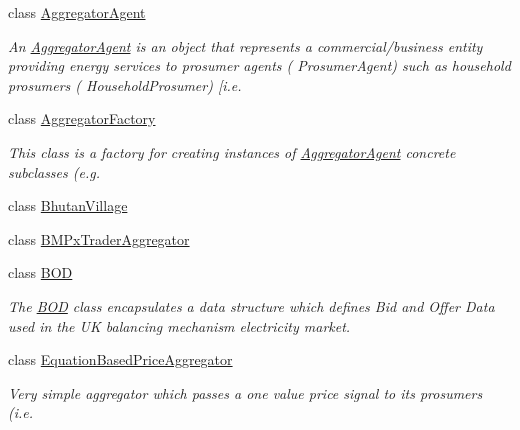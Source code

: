 \begin{DoxyCompactItemize}
\item 
class \hyperlink{classuk_1_1ac_1_1dmu_1_1iesd_1_1cascade_1_1agents_1_1aggregators_1_1_aggregator_agent}{Aggregator\-Agent}
\begin{DoxyCompactList}\small\item\em An {\itshape \hyperlink{classuk_1_1ac_1_1dmu_1_1iesd_1_1cascade_1_1agents_1_1aggregators_1_1_aggregator_agent}{Aggregator\-Agent}} is an object that represents a commercial/business entity providing energy services to prosumer agents ( {\ttfamily Prosumer\-Agent}) such as household prosumers ( {\ttfamily Household\-Prosumer}) \mbox{[}i.\-e. \end{DoxyCompactList}\item 
class \hyperlink{classuk_1_1ac_1_1dmu_1_1iesd_1_1cascade_1_1agents_1_1aggregators_1_1_aggregator_factory}{Aggregator\-Factory}
\begin{DoxyCompactList}\small\item\em This class is a factory for creating instances of {\ttfamily \hyperlink{classuk_1_1ac_1_1dmu_1_1iesd_1_1cascade_1_1agents_1_1aggregators_1_1_aggregator_agent}{Aggregator\-Agent}} concrete subclasses (e.\-g. \end{DoxyCompactList}\item 
class \hyperlink{classuk_1_1ac_1_1dmu_1_1iesd_1_1cascade_1_1agents_1_1aggregators_1_1_bhutan_village}{Bhutan\-Village}
\item 
class \hyperlink{classuk_1_1ac_1_1dmu_1_1iesd_1_1cascade_1_1agents_1_1aggregators_1_1_b_m_px_trader_aggregator}{B\-M\-Px\-Trader\-Aggregator}
\item 
class \hyperlink{classuk_1_1ac_1_1dmu_1_1iesd_1_1cascade_1_1agents_1_1aggregators_1_1_b_o_d}{B\-O\-D}
\begin{DoxyCompactList}\small\item\em The {\itshape \hyperlink{classuk_1_1ac_1_1dmu_1_1iesd_1_1cascade_1_1agents_1_1aggregators_1_1_b_o_d}{B\-O\-D}} class encapsulates a data structure which defines Bid and Offer Data used in the U\-K balancing mechanism electricity market. \end{DoxyCompactList}\item 
class \hyperlink{classuk_1_1ac_1_1dmu_1_1iesd_1_1cascade_1_1agents_1_1aggregators_1_1_equation_based_price_aggregator}{Equation\-Based\-Price\-Aggregator}
\begin{DoxyCompactList}\small\item\em Very simple aggregator which passes a one value price signal to its prosumers (i.\-e. \end{DoxyCompactList}\item 

\end{DoxyCompactItemize}
